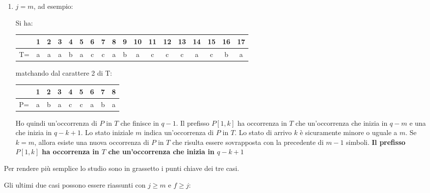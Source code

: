 \begin{enumerate}
\begin{enumerate}
    
    \item $j=m$, ad esempio:
    \begin{esempio}
      Si ha:
      \begin{table}[H]
        \centering
        \begin{tabular}{c||c|c|c|c|c|c|c|c|c|c|c|c|c|c|c|c|c}
          \hline
          & 1 & 2 & 3 & 4 & 5 & 6 & 7 & 8 & 9 & 10 & 11 & 12 & 13 &14&15&16&17\\
          \hline
          T=&a& a & a& b& a& c &c &a &b &a&c&c&c&a &c &b &a\\
          \hline
        \end{tabular}
      \end{table}
      matchando dal carattere 2 di T:
      \begin{table}[H]
        \centering
        \begin{tabular}{c||c|c|c|c|c|c|c|c}
          \hline
          & 1 & 2 & 3 & 4 & 5 & 6 & 7 &8\\
          \hline
          P=&a& b & a& c& c& a&b &a \\
          \hline
        \end{tabular}
      \end{table}
    \end{esempio}
    Ho quindi un'occorrenza di $P$ in $T$ che finisce in $q-1$. Il prefisso
    $P[1,k]$ ha occorrenza in $T$ che un'occorrenza che inizia in $q-m$ e una
    che inizia in $q-k+1$. Lo stato iniziale $m$ indica un’occorrenza di $P$ in
    $T$. Lo stato di arrivo $k$ è sicuramente minore o uguale a $m$. Se $k = m$,
    allora esiste una nuova occorrenza di $P$ in $T$ che risulta essere
    sovrapposta con la precedente di $m-1$ simboli. \textbf{Il prefisso
    $P[1,k]$ ha occorrenza in $T$ che un'occorrenza che inizia in $q-k+1$}
    

    \begin{center}
    \end{center}
  \end{enumerate}
  Per rendere più semplice lo studio sono in grassetto i punti chiave dei tre
  casi. 
\end{enumerate}
Gli ultimi due casi possono essere riassunti con $j\geq m$ e $f\geq j$:
